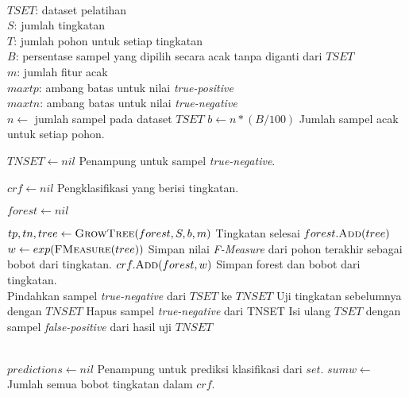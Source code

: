 \begin{center}
	\label{alg:crf}
	\begin{algorithmic}[1]
\Require \\
$ TSET $: dataset pelatihan \\
$ S $: jumlah tingkatan \\
$ T $: jumlah pohon untuk setiap tingkatan \\
$ B $: persentase sampel yang dipilih secara acak tanpa diganti dari $TSET$ \\
$ m $: jumlah fitur acak \\
$ maxtp $: ambang batas untuk nilai \textit{true-positive} \\
$ maxtn $: ambang batas untuk nilai \textit{true-negative}
\\
	\State $ n \gets $ jumlah sampel pada dataset $ TSET $
	\State $ b \gets n * (B / 100) $
	\Comment Jumlah sampel acak untuk setiap pohon.

	\State $ TNSET \gets nil $
	\Comment Penampung untuk sampel \textit{true-negative}.

	\State $ crf \gets nil $
	\Comment Pengklasifikasi yang berisi tingkatan.

		\State $ forest \gets nil $

			\State $ tp, tn, tree \gets \Call{GrowTree}{forest, S, b, m} $
				\State Tingkatan selesai
			\Else
				\State $ forest.\Call{Add}{tree} $
			\EndIf
		\EndFor
		\\
		\State $w \gets exp(\Call{FMeasure}{tree}) $
		\Comment Simpan nilai \textit{F-Measure} dari pohon terakhir sebagai
		bobot dari tingkatan.
		\State $ crf.\Call{Add}{forest, w} $
		\Comment Simpan forest dan bobot dari tingkatan.
		\\
			\State Pindahkan sampel \textit{true-negative} dari
			$TSET$ ke $TNSET$
		\Else
			\State Uji tingkatan sebelumnya dengan $TNSET$
			\State Hapus sampel \textit{true-negative} dari TNSET
			\State Isi ulang $TSET$ dengan sampel
			\textit{false-positive} dari hasil uji $TNSET$
		\EndIf
	\EndFor

	\State {}
\EndFunction
\\
	\State $ predictions \gets nil $
	\Comment Penampung untuk prediksi klasifikasi dari $set$.
	\State $ sumw \gets $ Jumlah semua bobot tingkatan dalam $crf$.


\end{algorithmic}
\end{center}

